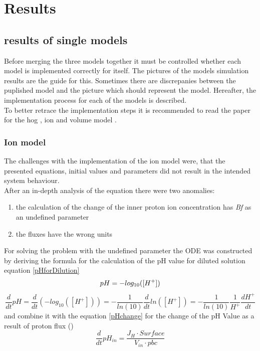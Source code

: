 \section{Results}
\subsection{results of single models}
Before merging the three models together it must be controlled whether each model is implemented correctly for itself. The pictures of the models simulation results are the guide for this. Sometimes there are discrepanies between the puplished model and the picture which should represent the model.  Hereafter, the implementation process for each of the models is described.\\
To better retrace the implementation steps it is recommended to read the paper for the hog \cite{Zi_2010}, ion \cite{Gerber_2016} and volume model  \cite{volumeModel}.

\subsubsection{Ion model}
The challenges with the implementation of the ion model were, that the presented equations, initial values and parameters did not result in the intended system behaviour. \\
After an in-depth analysis of the equation there were two anomalies:

\begin{enumerate}
	\item the calculation of the change of the inner proton ion concentration has \emph{Bf} as an undefined parameter
	\item the fluxes have the wrong units
\end{enumerate}

For solving the problem with the undefined parameter the ODE was constructed by deriving the formula for the calculation of the pH value for diluted solution equation \ref{pHforDilution}
\begin{equation*}
	pH = - log_{10}([H^+])\\
\end{equation*}
\begin{equation}\label{pHforDilution}
	\frac{d}{dt}pH = \frac{d}{dt}(-log_{10}([H^+])) = - \frac{1}{ln(10)} \frac{d}{dt}ln([H^+]) = - \frac{1}{ln(10)}\frac{1}{H^+} \frac{dH^+}{dt}
\end{equation}
and combine it with the equation \ref{pHchange} for the change of the pH Value as a result of proton flux (\cite{martinafroehlich})
\begin{equation}\label{pHchange}
	\frac{d}{dt}pH_{in} = \frac{J_H \cdot Surface}{V_{in} \cdot pbc}
\end{equation}
	
